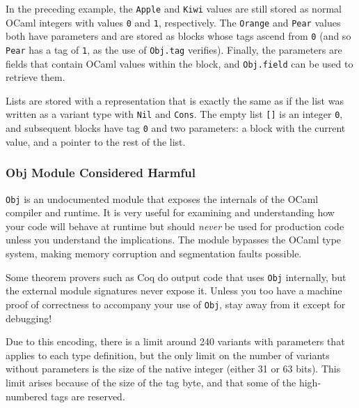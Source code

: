 In the preceding example, the \passthrough{\lstinline!Apple!} and
\passthrough{\lstinline!Kiwi!} values are still stored as normal OCaml
integers with values \passthrough{\lstinline!0!} and
\passthrough{\lstinline!1!}, respectively. The
\passthrough{\lstinline!Orange!} and \passthrough{\lstinline!Pear!}
values both have parameters and are stored as blocks whose tags ascend
from \passthrough{\lstinline!0!} (and so \passthrough{\lstinline!Pear!}
has a tag of \passthrough{\lstinline!1!}, as the use of
\passthrough{\lstinline!Obj.tag!} verifies). Finally, the parameters are
fields that contain OCaml values within the block, and
\passthrough{\lstinline!Obj.field!} can be used to retrieve them.

Lists are stored with a representation that is exactly the same as if
the list was written as a variant type with
\passthrough{\lstinline!Nil!} and \passthrough{\lstinline!Cons!}. The
empty list \passthrough{\lstinline![]!} is an integer
\passthrough{\lstinline!0!}, and subsequent blocks have tag
\passthrough{\lstinline!0!} and two parameters: a block with the current
value, and a pointer to the rest of the list.

\hypertarget{obj-module-considered-harmful}{%
\subsubsection{Obj Module Considered
Harmful}\label{obj-module-considered-harmful}}

\passthrough{\lstinline!Obj!} is an undocumented module that exposes the
internals of the OCaml compiler and runtime. It is very useful for
examining and understanding how your code will behave at runtime but
should \emph{never} be used for production code unless you understand
the implications. The module bypasses the OCaml type system, making
memory corruption and segmentation faults possible.

Some theorem provers such as Coq do output code that uses
\passthrough{\lstinline!Obj!} internally, but the external module
signatures never expose it. Unless you too have a machine proof of
correctness to accompany your use of \passthrough{\lstinline!Obj!}, stay
away from it except for debugging!

Due to this encoding, there is a limit around 240 variants with
parameters that applies to each type definition, but the only limit on
the number of variants without parameters is the size of the native
integer (either 31 or 63 bits). This limit arises because of the size of
the tag byte, and that some of the high-numbered tags are reserved.

